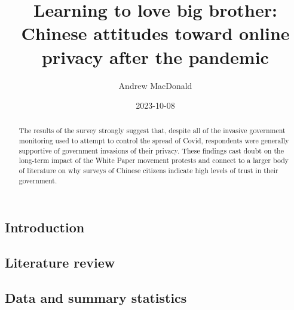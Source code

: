 \documentclass[
  letterpaper,
  DIV=11,
  numbers=noendperiod]{scrartcl}
\title{Learning to love big brother: Chinese attitudes toward online
privacy after the pandemic}
\author{Andrew MacDonald}
\date{2023-10-08}
\begin{document}
\maketitle
\begin{abstract}
The results of the survey strongly suggest that, despite all of the
invasive government monitoring used to attempt to control the spread of
Covid, respondents were generally supportive of government invasions of
their privacy. These findings cast doubt on the long-term impact of the
White Paper movement protests and connect to a larger body of literature
on why surveys of Chinese citizens indicate high levels of trust in
their government.
\end{abstract}
\ifdefined\Shaded\renewenvironment{Shaded}{\begin{tcolorbox}[sharp corners, borderline west={3pt}{0pt}{shadecolor}, breakable, interior hidden, boxrule=0pt, frame hidden, enhanced]}{\end{tcolorbox}}\fi

\hypertarget{introduction}{%
\subsection{Introduction}\label{introduction}}

\hypertarget{literature-review}{%
\subsection{Literature review}\label{literature-review}}

\hypertarget{data-and-summary-statistics}{%
\subsection{Data and summary
statistics}\label{data-and-summary-statistics}}
\end{document}

